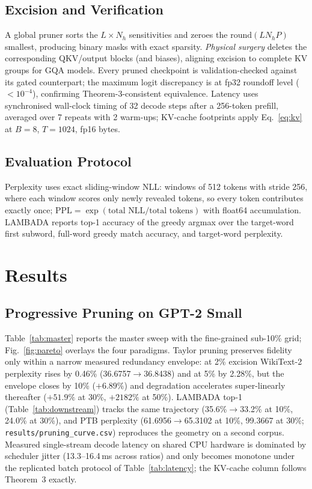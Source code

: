 \documentclass[11pt]{article}
\newcommand{\ppl}{\mathrm{PPL}}
\begin{document}
\subsection{Excision and Verification}
A global pruner sorts the $L\times N_h$ sensitivities and zeroes the
$\mathrm{round}(LN_hP)$ smallest, producing binary masks with exact sparsity.
\emph{Physical surgery} deletes the corresponding QKV/output blocks (and biases),
aligning excision to complete KV groups for GQA models. Every pruned checkpoint is
validation-checked against its gated counterpart; the maximum logit discrepancy is
at fp32 roundoff level ($<10^{-4}$), confirming Theorem-3-consistent
equivalence. Latency uses synchronised wall-clock timing of 32 decode steps after
a 256-token prefill, averaged over 7 repeats with 2 warm-ups; KV-cache footprints
apply Eq.~\ref{eq:kv} at $B{=}8$, $T{=}1024$, fp16 bytes.

\subsection{Evaluation Protocol}
Perplexity uses exact sliding-window NLL: windows of 512 tokens with stride 256,
where each window scores only newly revealed tokens, so every token contributes
exactly once; $\ppl=\exp(\text{total NLL}/\text{total tokens})$ with float64
accumulation. LAMBADA reports top-1 accuracy of the greedy argmax over the
target-word first subword, full-word greedy match accuracy, and target-word
perplexity.

\section{Results}
\subsection{Progressive Pruning on GPT-2 Small}
Table~\ref{tab:master} reports the master sweep with the fine-grained sub-10\% grid;
Fig.~\ref{fig:pareto} overlays the four paradigms. Taylor pruning preserves fidelity
only within a narrow measured redundancy envelope: at 2\% excision WikiText-2
perplexity rises by 0.46\% (36.6757$\to$36.8438) and at 5\% by 2.28\%, but the
envelope closes by 10\% ($+6.89\%$) and degradation accelerates super-linearly
thereafter ($+51.9\%$ at 30\%, $+2182\%$ at 50\%). LAMBADA top-1
(Table~\ref{tab:downstream}) tracks the same trajectory (35.6\%$\to$33.2\% at 10\%,
24.0\% at 30\%), and PTB perplexity (61.6956$\to$65.3102 at 10\%, 99.3667 at 30\%;
\texttt{results/pruning\_curve.csv}) reproduces the geometry on a second corpus. Measured single-stream decode latency on shared CPU hardware is
dominated by scheduler jitter (13.3--16.4\,ms across ratios) and only becomes
monotone under the replicated batch protocol of Table~\ref{tab:latency}; the
KV-cache column follows Theorem~3 exactly.
\end{document}
